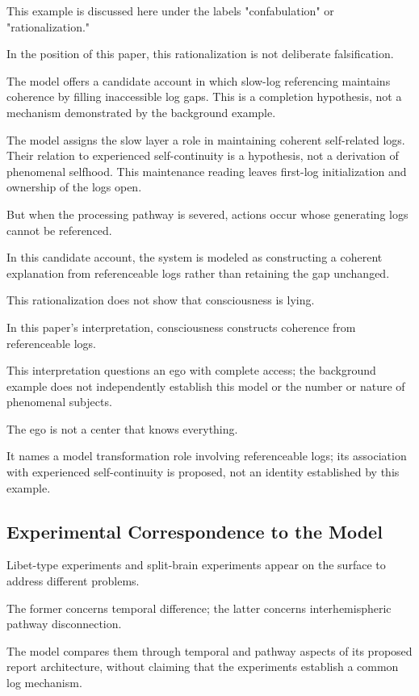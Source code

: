 This example is discussed here under the labels "confabulation" or "rationalization."

In the position of this paper, this rationalization is not deliberate falsification.

The model offers a candidate account in which slow-log referencing maintains coherence by filling inaccessible log gaps. This is a completion hypothesis, not a mechanism demonstrated by the background example.

The model assigns the slow layer a role in maintaining coherent self-related logs. Their relation to experienced self-continuity is a hypothesis, not a derivation of phenomenal selfhood. This maintenance reading leaves first-log initialization and ownership of the logs open.

But when the processing pathway is severed, actions occur whose generating logs cannot be referenced.

In this candidate account, the system is modeled as constructing a coherent explanation from referenceable logs rather than retaining the gap unchanged.

This rationalization does not show that consciousness is lying.

In this paper's interpretation, consciousness constructs coherence from referenceable logs.

This interpretation questions an ego with complete access; the background example does not independently establish this model or the number or nature of phenomenal subjects.

The ego is not a center that knows everything.

It names a model transformation role involving referenceable logs; its association with experienced self-continuity is proposed, not an identity established by this example.

\subsection{Experimental Correspondence to the Model}


Libet-type experiments and split-brain experiments appear on the surface to address different problems.

The former concerns temporal difference; the latter concerns interhemispheric pathway disconnection.

The model compares them through temporal and pathway aspects of its proposed report architecture, without claiming that the experiments establish a common log mechanism.

